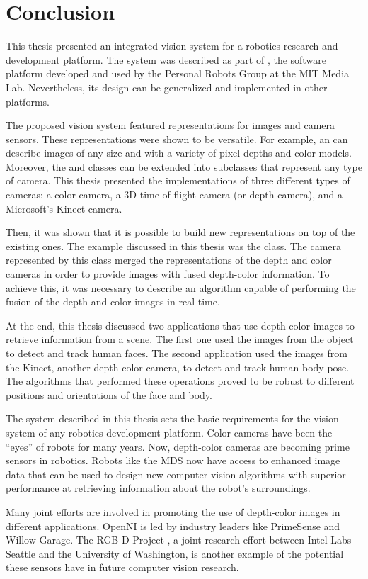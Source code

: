 \chapter{Conclusion} \label{conclusion}

This thesis presented an integrated vision system for a robotics research and development platform. The 
system was described as part of \RD{}, the software platform developed and used by the Personal Robots 
Group at the MIT Media Lab. Nevertheless, its design can be generalized and implemented in other platforms.

The proposed vision system featured representations for images and camera sensors. These representations
were shown to be versatile. For example, an \ImageBuffer{} can describe images of any size and with a variety 
of pixel depths and color models. Moreover, the \Camera{} and \CameraReceiver{} classes can be extended 
into subclasses that represent any type of camera. This thesis presented the implementations of three different 
types of cameras: a color camera, a 3D time-of-flight camera (or depth camera), and a Microsoft's Kinect 
camera.

Then, it was shown that it is possible to build new representations on top of the existing ones. The example 
discussed in this thesis was the \DepthColorCam{} class. The camera represented by this class merged the
representations of the depth and color cameras in order to provide images with fused depth-color information. 
To achieve this, it was necessary to describe an algorithm capable of performing the fusion of the depth and 
color images in real-time.

At the end, this thesis discussed two applications that use depth-color images to retrieve information from a 
scene. The first one used the images from the \DepthColorCam{} object to detect and track human faces. The
second application used the images from the Kinect, another depth-color camera, to detect and track human 
body pose. The algorithms that performed these operations proved to be robust to different positions and 
orientations of the face and body.

The system described in this thesis sets the basic requirements for the vision system of any robotics 
development platform. Color cameras have been the ``eyes'' of robots for many years. Now, depth-color 
cameras are becoming prime sensors in robotics. Robots like the MDS now have access to enhanced image 
data that can be used to design new computer vision algorithms with superior performance at retrieving
information about the robot's surroundings. 

Many joint efforts are involved in promoting the use of depth-color images in different applications. OpenNI is
led by industry leaders like PrimeSense and Willow Garage. The RGB-D Project \cite{RGBDProject}, a joint 
research effort between Intel Labs Seattle and the University of Washington, is another example of the 
potential these sensors have in future computer vision research.

